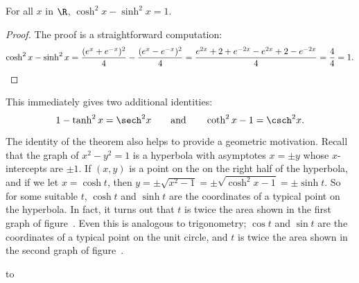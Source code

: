 \begin{theorem} For all $x$ in $\R$, $\cosh ^2 x -\sinh ^2 x = 1$.
\begin{proof} The proof is a straightforward computation:
$$\cosh ^2 x -\sinh ^2 x =
 {(e^x +e^{-x} )^2\over 4} -{(e^x -e^{-x} )^2\over 4}=
 {e^{2x} + 2 + e^{-2x } - e^{2x } + 2 - e^{-2x}\over 4}=
 {4\over 4} = 1.
$$
\end{proof}

This immediately gives two additional identities:
$$1-\tanh^2 x =\sech^2 x\qquad\hbox{and}\qquad
\coth^2 x - 1  =\csch^2 x.$$

The identity of the theorem also helps to provide a geometric
motivation. Recall that the graph of $x^2 -y^2 =1 $ is a hyperbola
with asymptotes $x=\pm y $ whose $x$-intercepts are $\pm 1 $. If
$(x,y)$ is a point on the on the right half of the hyperbola, and if
we let $x=\cosh t$, then
$y=\pm\sqrt{x^2-1}=\pm\sqrt{\cosh^2x-1}=\pm\sinh t$. So for some
suitable $t$, $\cosh t$ and $\sinh t$ are the coordinates of a typical
point on the hyperbola. In fact, it turns out that $t$ is twice the
area shown in the first graph of 
figure~.  Even
this is analogous to trigonometry; $\cos t$ and $\sin t$ are the
coordinates of a typical point on the unit circle, and $t$ is twice
the area shown in the second graph of figure~. 

\figure
\hbox to 


\end{theorem}
